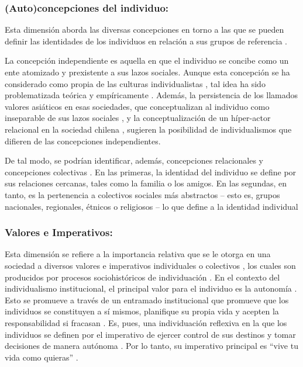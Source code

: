 \documentclass[12pt,twoside]{templates/facsothesis}
\begin{document}
\hypertarget{autoconcepciones-del-individuo}{%
\subsubsection*{(Auto)concepciones del individuo:}\label{autoconcepciones-del-individuo}}

Esta dimensión aborda las diversas concepciones en torno a las que se pueden definir las identidades de los individuos en relación a sus grupos de referencia \citep{brewer2007}.

La concepción independiente es aquella en que el individuo se concibe como un ente atomizado y prexistente a sus lazos sociales. Aunque esta concepción se ha considerado como propia de las culturas individualistas \citep{benavides2020, cross2011}, tal idea ha sido problematizada teórica \citep{voronov2002} y empíricamente \citep{benavides2020, kolstad2009}. Además, la persistencia de los llamados valores asiáticos en esas sociedades, que conceptualizan al individuo como inseparable de sus lazos sociales \citep{zhai2022}, y la conceptualización de un híper-actor relacional en la sociedad chilena \citep{araujo2020}, sugieren la posibilidad de individualismos que difieren de las concepciones independientes.

De tal modo, se podrían identificar, además, concepciones relacionales y concepciones colectivas \citep{brewer2007}. En las primeras, la identidad del individuo se define por sus relaciones cercanas, tales como la familia o los amigos. En las segundas, en tanto, es la pertenencia a colectivos sociales más abstractos -- esto es, grupos nacionales, regionales, étnicos o religiosos -- lo que define a la identidad individual \citep{brewer2007}

\hypertarget{valores-e-imperativos}{%
\subsubsection*{Valores e Imperativos:}\label{valores-e-imperativos}}

Esta dimensión se refiere a la importancia relativa que se le otorga en una sociedad a diversos valores e imperativos individuales o colectivos \citep{brewer2007}, los cuales son producidos por procesos sociohistóricos de individuación \citep{martuccelli2018}. En el contexto del individualismo institucional, el principal valor para el individuo es la autonomía \citep{martuccelli2010}. Esto se promueve a través de un entramado institucional \citep{martuccelli2018} que promueve que los individuos se constituyen a sí mismos, planifique su propia vida y acepten la responsabilidad si fracasan \citep{robles2001}. Es, pues, una individuación reflexiva en la que los individuos se definen por el imperativo de ejercer control de sus destinos y tomar decisiones de manera autónoma \citep{silvapalacios2015}. Por lo tanto, su imperativo principal es ``vive tu vida como quieras'' \citep{robles2001}.
\end{document}
